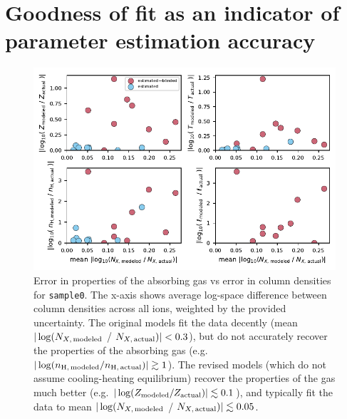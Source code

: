 \documentclass[fleqn,usenatbib]{mnras}
\begin{document}


\appendix

\section{Goodness of fit as an indicator of parameter estimation accuracy}
\label{a: error vs error}

\begin{figure}
    \centering
    \includegraphics[width=\textwidth]{figures/sample0/error_vs_error.pdf}
    \caption{
    Error in properties of the absorbing gas vs error in column densities for \texttt{sample0}.
    The x-axis shows average log-space difference between column densities across all ions, weighted by the provided uncertainty.
    The original models fit the data decently (mean $\vert \log( N_{X,\,{\rm modeled}}$ / $N_{X,\,{\rm actual}}) \vert < 0.3$), but do not accurately recover the properties of the absorbing gas (e.g. $\vert \log( n_{\rm H,\,modeled} / n_{\rm H,\,actual}) \vert \gtrsim 1$).
    The revised models (which do not assume cooling-heating equilibrium) recover the properties of the gas much better (e.g. $\vert \log( Z_{\rm modeled} / Z_{\rm actual}) \vert \lesssim 0.1$), and typically fit the data to mean $\vert \log( N_{X,\,{\rm modeled}}$ / $N_{X,\,{\rm actual}}) \vert \lesssim 0.05$.
    }
    \label{f: error vs error}
\end{figure}
\end{document}
